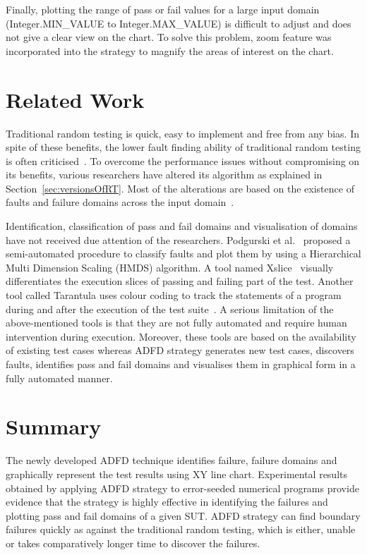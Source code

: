 Finally, plotting the range of pass or fail values for a large input domain (Integer.MIN\_VALUE to Integer.MAX\_VALUE) is difficult to adjust and does not give a clear view on the chart. To solve this problem, zoom feature was incorporated into the strategy to magnify the areas of interest on the chart.



\section{Related Work} \label{sec:relatedWork}
Traditional random testing is quick, easy to implement and free from any bias. In spite of these benefits, the lower fault finding ability of traditional random testing is often criticised~\cite{myers2011art, offutt1996semantic}. To overcome the performance issues without compromising on its benefits, various researchers have altered its algorithm as explained in Section~\ref{sec:versionsOfRT}. Most of the alterations are based on the existence of faults and failure domains across the input domain~\cite{chan1996proportional}. 

Identification, classification of pass and fail domains and visualisation of domains have not received due attention of the researchers. Podgurski et al.~\cite{podgurski2003automated} proposed a semi-automated procedure to classify faults and plot them by using a Hierarchical Multi Dimension Scaling (HMDS) algorithm. A tool named Xslice~\cite{agrawal1995fault} visually differentiates the execution slices of passing and failing part of the test. Another tool called Tarantula uses colour coding to track the statements of a program during and after the execution of the test suite~\cite{jones2002visualization}. A serious limitation of the above-mentioned tools is that they are not fully automated and require human intervention during execution. Moreover, these tools are based on the availability of existing test cases whereas ADFD strategy generates new test cases, discovers faults, identifies pass and fail domains and visualises them in graphical form in a fully automated manner. 


\section{Summary} \label{sec:conclusion}
The newly developed ADFD technique identifies failure, failure domains and graphically represent the test results using XY line chart. Experimental results obtained by applying ADFD strategy to error-seeded numerical programs provide evidence that the strategy is highly effective in identifying the failures and plotting pass and fail domains of a given SUT. ADFD strategy can find boundary failures quickly as against the traditional random testing, which is either, unable or takes comparatively longer time to discover the failures.

